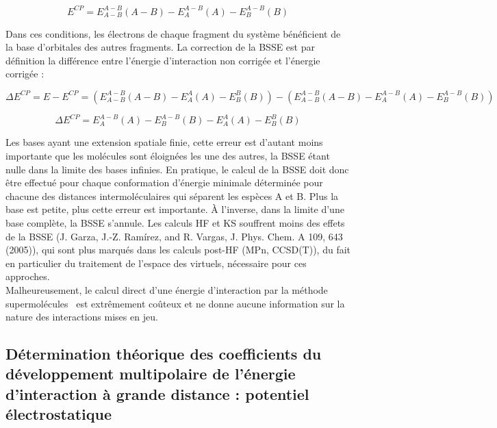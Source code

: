 \documentclass[12pt,a4paper]{book}
\begin{document}
	\begin{equation}
	E^{CP} = E_{A-B}^{A-B}(A-B) - E_{A}^{A-B}(A) - E_{B}^{A-B}(B)
	\end{equation}
	
	Dans ces conditions, les électrons de chaque fragment du système bénéficient de la base d'orbitales des autres fragments. La correction de la BSSE est par définition la différence entre l'énergie d'interaction non corrigée et l'énergie corrigée :
	
	\begin{equation}
	\Delta E^{CP} = E - E^{CP} = (E_{A-B}^{A-B}(A-B) - E_{A}^{A}(A) - E_{B}^{B}(B)) - (E_{A-B}^{A-B}(A-B) - E_{A}^{A-B}(A) - E_{B}^{A-B}(B))
	\end{equation}
	
	\begin{equation}
	\Delta E^{CP} =  E_{A}^{A-B}(A) - E_{B}^{A-B}(B) - E_{A}^{A}(A) - E_{B}^{B}(B)
	\end{equation}
	
	Les bases ayant une extension spatiale finie, cette erreur est d'autant moins importante que les molécules sont éloignées les une des autres, la BSSE étant nulle dans la limite des bases infinies. En pratique, le calcul de la BSSE doit donc être effectué pour chaque conformation d’énergie minimale déterminée pour chacune des distances intermoléculaires qui séparent les espèces A et B. Plus la base est petite, plus cette erreur est importante. À l'inverse, dans la limite d’une base complète, la BSSE s’annule.
	Les calculs HF et KS souffrent moins des effets de la BSSE (J. Garza, J.-Z. Ramírez, and R. Vargas, J. Phys. Chem. A 109, 643 (2005)), qui sont plus marqués dans les calculs post-HF (MPn, CCSD(T)), du fait en particulier du traitement de l’espace des virtuels, nécessaire pour ces approches.\\
	
	
	Malheureusement, le calcul direct d’une énergie d’interaction par la méthode \og supermolécules \fg{} est extrêmement coûteux et ne donne aucune information sur la nature des interactions mises en jeu.\\
	
	\subsection{Détermination théorique des coefficients du développement multipolaire de l’énergie d'interaction à grande distance : potentiel électrostatique}
	
\end{document}
